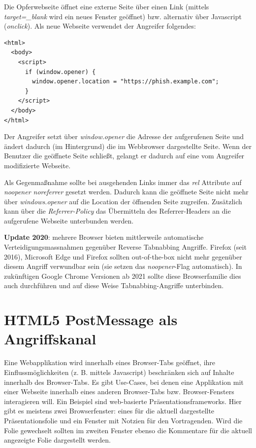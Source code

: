 Die Opferwebseite öffnet eine externe Seite über einen Link (mittels \textit{target=\_blank} wird ein neues Fenster geöffnet) bzw. alternativ über Javascript (\textit{onclick}). Als neue Webseite verwendet der Angreifer folgendes:

\begin{verbatim}
<html>
  <body>
    <script>
      if (window.opener) {
        window.opener.location = "https://phish.example.com";
      }
    </script>
  </body>
</html>
\end{verbatim}

Der Angreifer setzt über \textit{window.opener} die Adresse der aufgerufenen Seite und ändert dadurch (im Hintergrund) die im Webbrowser dargestellte Seite. Wenn der Benutzer die geöffnete Seite schließt, gelangt er dadurch auf eine vom Angreifer modifizierte Webseite.

Als Gegenmaßnahme sollte bei ausgehenden Links immer das \textit{rel} Attribute auf \textit{noopener noreferrer} gesetzt werden. Dadurch kann die geöffnete Seite nicht mehr über \textit{windows.opener} auf die Location der öffnenden Seite zugreifen. Zusätzlich kann über die \textit{Referrer-Policy} das Übermitteln des Referrer-Headers an die aufgerufene Webseite unterbunden werden.

\textbf{Update 2020}: mehrere Browser bieten mittlerweile automatische Verteidigungsmassnahmen gegenüber Reverse Tabnabbing Angriffe. Firefox (seit 2016), Microsoft Edge und Firefox sollten out-of-the-box nicht mehr gegenüber diesem Angriff verwundbar sein (sie setzen das \textit{noopener}-Flag automatisch). In zukünftigen Google Chrome Versionen ab 2021 sollte diese Browserfamilie dies auch durchführen und auf diese Weise Tabnabbing-Angriffe unterbinden.

\section{HTML5 PostMessage als Angriffskanal}

Eine Webapplikation wird innerhalb eines Browser-Tabs geöffnet, ihre Einflussmöglichkeiten (z. B. mittels Javascript) beschränken sich auf Inhalte innerhalb des Browser-Tabs. Es gibt Use-Cases, bei denen eine Applikation mit einer Webseite innerhalb eines anderen Browser-Tabs bzw. Browser-Fensters interagieren will. Ein Beispiel sind web-basierte Präsentationsframeworks. Hier gibt es meistens zwei Browserfenster: eines für die aktuell dargestellte Präsentationsfolie und ein Fenster mit Notzien für den Vortragenden. Wird die Folie gewechselt sollten im zweiten Fenster ebenso die Kommentare für die aktuell angezeigte Folie dargestellt werden.


